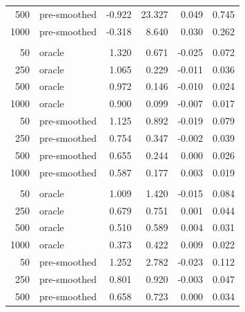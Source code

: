 \documentclass[useAMS,usenatbib,referee]{biom}
\begin{document}
\begin{table}[t]
\begin{tabular}{rlrrrr}
\hspace{1em}500 & pre-smoothed & -0.922 & 23.327 & 0.049 & 0.745\\
\hspace{1em}1000 & pre-smoothed & -0.318 & 8.640 & 0.030 & 0.262\\
\addlinespace[0.3em]
\multicolumn{6}{l}{\textbf{Kernel}}\\
\hspace{1em}50 & oracle & 1.320 & 0.671 & -0.025 & 0.072\\
\hspace{1em}250 & oracle & 1.065 & 0.229 & -0.011 & 0.036\\
\hspace{1em}500 & oracle & 0.972 & 0.146 & -0.010 & 0.024\\
\hspace{1em}1000 & oracle & 0.900 & 0.099 & -0.007 & 0.017\\
\hspace{1em}50 & pre-smoothed & 1.125 & 0.892 & -0.019 & 0.079\\
\hspace{1em}250 & pre-smoothed & 0.754 & 0.347 & -0.002 & 0.039\\
\hspace{1em}500 & pre-smoothed & 0.655 & 0.244 & 0.000 & 0.026\\
\hspace{1em}1000 & pre-smoothed & 0.587 & 0.177 & 0.003 & 0.019\\
\addlinespace[0.3em]
\multicolumn{6}{l}{\textbf{Linear}}\\
\hspace{1em}50 & oracle & 1.009 & 1.420 & -0.015 & 0.084\\
\hspace{1em}250 & oracle & 0.679 & 0.751 & 0.001 & 0.044\\
\hspace{1em}500 & oracle & 0.510 & 0.589 & 0.004 & 0.031\\
\hspace{1em}1000 & oracle & 0.373 & 0.422 & 0.009 & 0.022\\
\hspace{1em}50 & pre-smoothed & 1.252 & 2.782 & -0.023 & 0.112\\
\hspace{1em}250 & pre-smoothed & 0.801 & 0.920 & -0.003 & 0.047\\
\hspace{1em}500 & pre-smoothed & 0.658 & 0.723 & 0.000 & 0.034\\

\end{tabular}
\end{table}
\end{document}

